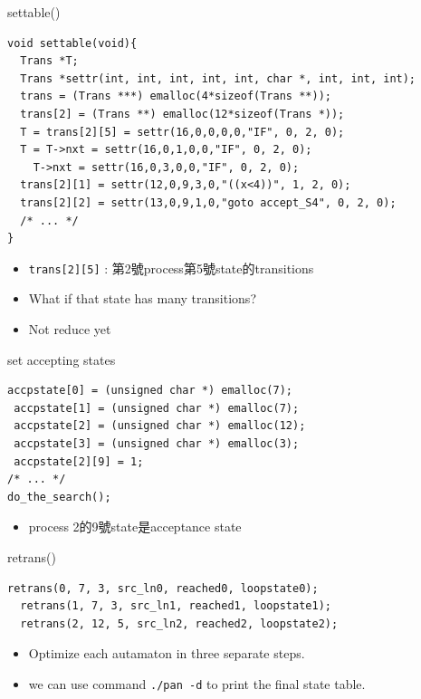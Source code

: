 \documentclass[12pt]{beamer}
\newcommand{\code}[1]{\texttt{#1}}
\begin{document}
\begin{frame}[fragile]{settable()}
\begin{lstlisting}[basicstyle=\footnotesize\ttfamily]
void settable(void){ 
  Trans *T;
  Trans *settr(int, int, int, int, int, char *, int, int, int);
  trans = (Trans ***) emalloc(4*sizeof(Trans **));
  trans[2] = (Trans **) emalloc(12*sizeof(Trans *));
  T = trans[2][5] = settr(16,0,0,0,0,"IF", 0, 2, 0);
  T = T->nxt = settr(16,0,1,0,0,"IF", 0, 2, 0);
    T->nxt = settr(16,0,3,0,0,"IF", 0, 2, 0);
  trans[2][1] = settr(12,0,9,3,0,"((x<4))", 1, 2, 0);
  trans[2][2] = settr(13,0,9,1,0,"goto accept_S4", 0, 2, 0);
  /* ... */
}
\end{lstlisting}
\begin{itemize}
	\item \code{trans[2][5]} : 第2號process第5號state的transitions
	\item What if that state has many transitions? \only<2>{Linked list can help.}
	\item Not reduce yet
\end{itemize}
\end{frame}

\begin{frame}[fragile]{set accepting states}
\begin{lstlisting}[basicstyle=\normalsize\ttfamily]   
 accpstate[0] = (unsigned char *) emalloc(7);
 accpstate[1] = (unsigned char *) emalloc(7);
 accpstate[2] = (unsigned char *) emalloc(12);
 accpstate[3] = (unsigned char *) emalloc(3);
 accpstate[2][9] = 1;
/* ... */
do_the_search();
\end{lstlisting}
\begin{itemize}
	\item process 2的9號state是acceptance state
\end{itemize}
\end{frame}

\begin{frame}[fragile]{retrans()}
\begin{lstlisting}[basicstyle=\normalsize\ttfamily]   
  retrans(0, 7, 3, src_ln0, reached0, loopstate0);
  retrans(1, 7, 3, src_ln1, reached1, loopstate1);
  retrans(2, 12, 5, src_ln2, reached2, loopstate2);
\end{lstlisting}
\begin{itemize}
	\item Optimize each autamaton in three separate steps.
	\item we can use command \code{./pan -d} to print the final state table.
\end{itemize}
\end{frame}
\end{document}
